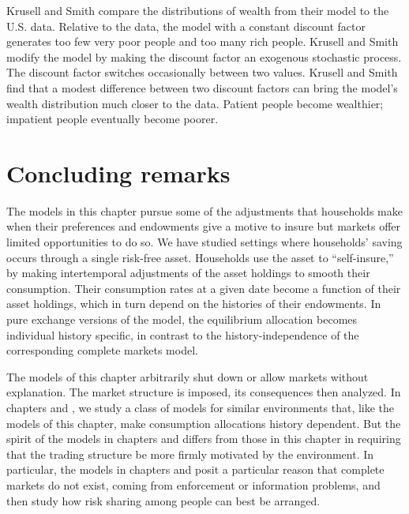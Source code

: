   Krusell and Smith  compare the distributions of wealth
from their model to the U.S. data.  Relative to the data, the model
with a constant discount factor generates too few very poor
people and too many rich people.   Krusell and Smith modify the
model by making the discount factor an exogenous stochastic process.
The discount factor switches occasionally between two values.  Krusell and
Smith find   that a modest difference between two discount factors can
bring the model's wealth distribution much closer to the data.
Patient people become wealthier; impatient people eventually become
poorer.


\section{Concluding remarks}
  The models in this chapter pursue some of the adjustments
that households  make when their preferences and
endowments give a motive to insure but markets offer
limited opportunities to do so.  We have studied
settings where households' saving  occurs through a single
risk-free asset.  Households use the asset to ``self-insure,''
by making intertemporal adjustments of the asset holdings to smooth
their consumption. Their consumption  rates at a given
date become a function of their asset holdings,
which in turn depend on the  histories of their
endowments.   In pure exchange versions of the model,
the equilibrium allocation becomes individual history specific,
in contrast to the history-independence of the corresponding
complete markets model.


  The models of this chapter arbitrarily shut down or allow markets
without explanation.   The market structure is imposed, its consequences
then analyzed.  In chapters 
and , we study a class of  models
for similar environments that, like the models of this chapter,
make consumption allocations history dependent. But
the spirit of the models in chapters 
and   differs from
those in this chapter in requiring that the trading structure
be more firmly motivated by the environment.  In particular,
the models in chapters 
and 
posit a particular   reason that complete markets do not exist,
coming from enforcement or information problems, and then study how
risk sharing among people can best be arranged.


\showchaptIDfalse
\showsectIDfalse
